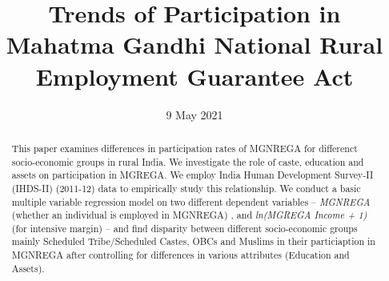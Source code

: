 \documentclass{article}
\title{\textbf{Trends of Participation in Mahatma Gandhi National Rural Employment Guarantee Act}}
\author{{ Ananya Shamra} \and { Nehal Khurana}  \and { Nikhil Raj} \\ \and {Shourya Marwaha} \and{Yeshuraj Joshi} \\ \\ {\and} 
{\text{Submitted to:}} \\
{Prof. Bhanu Gupta\footnote{Submitted to Professor Bhanu Gupta as a part of the course: Public Economics (ECO-3630)}}}
\date{9 May 2021}
\begin{document}
\maketitle
\begin{abstract}
    This paper examines differences in participation rates of MGNREGA for differenct socio-economic groups in rural India. We investigate the role of caste, education and assets on participation in MGREGA. We employ India Human Development Survey-II (IHDS-II) (2011-12) data to empirically study this relationship. We conduct a basic multiple variable regression model on two different dependent variables – \emph{MGNREGA} (whether an individual is employed in MGNREGA) , and \emph{ln(MGREGA Income + 1)} (for intensive margin) – and find disparity between different socio-economic groups mainly Scheduled Tribe/Scheduled Castes, OBCs and Muslims in their particiaption in MGNREGA after controlling for differences in various attributes (Education and Assets). 
\end{abstract}
\newpage
\end{document}

